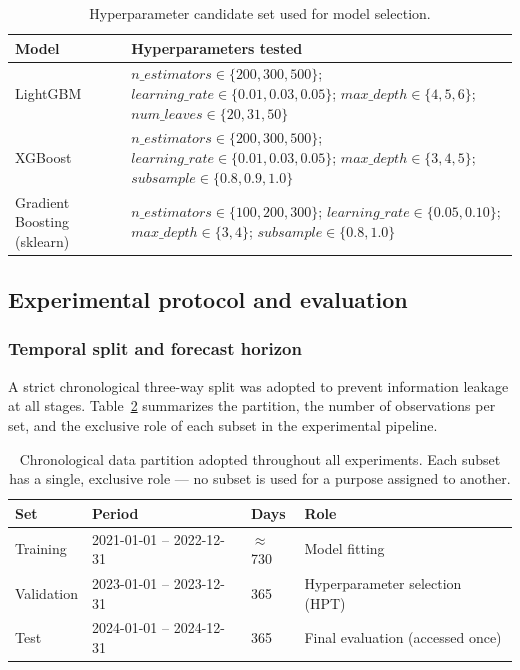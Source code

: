\begin{table}[t]
\centering
\caption{Hyperparameter candidate set used for model selection.}
\label{tab:hyperparams}
\footnotesize
\begin{tabular}{p{3.2cm} p{7.8cm}}
\toprule
\textbf{Model} & \textbf{Hyperparameters tested} \\
\midrule
LightGBM & $n\_estimators \in \{200, 300, 500\}$; $learning\_rate \in \{0.01, 0.03, 0.05\}$; $max\_depth \in \{4, 5, 6\}$; $num\_leaves \in \{20, 31, 50\}$ \\
\midrule
XGBoost & $n\_estimators \in \{200, 300, 500\}$; $learning\_rate \in \{0.01, 0.03, 0.05\}$; $max\_depth \in \{3, 4, 5\}$; $subsample \in \{0.8, 0.9, 1.0\}$ \\
\midrule
Gradient Boosting (sklearn) & $n\_estimators \in \{100, 200, 300\}$; $learning\_rate \in \{0.05, 0.10\}$; $max\_depth \in \{3, 4\}$; $subsample \in \{0.8, 1.0\}$ \\
\bottomrule
\end{tabular}
\end{table}


\subsection{Experimental protocol and evaluation}
\label{subsec:experimental_setup}

\subsubsection{Temporal split and forecast horizon}

A strict chronological three-way split was adopted to prevent information leakage at all stages. Table~\ref{tab:split} summarizes the partition, the number of observations per set, and the exclusive role of each subset in the experimental pipeline.

\begin{table}[!h]
\centering
\caption{Chronological data partition adopted throughout all experiments. Each subset has a single, exclusive role — no subset is used for a purpose assigned to another.}
\label{tab:split}
\footnotesize
\begin{tabular}{p{1.5cm} p{2.8cm} p{1.4cm} p{2.2cm}}
\toprule
\textbf{Set} & \textbf{Period} & \textbf{Days} & \textbf{Role} \\
\midrule
Training   & 2021-01-01 -- 2022-12-31 & $\approx$730 & Model fitting \\
Validation & 2023-01-01 -- 2023-12-31 & 365 & Hyperparameter selection (HPT) \\
Test       & 2024-01-01 -- 2024-12-31 & 365 & Final evaluation (accessed once) \\
\bottomrule
\end{tabular}
\end{table}

